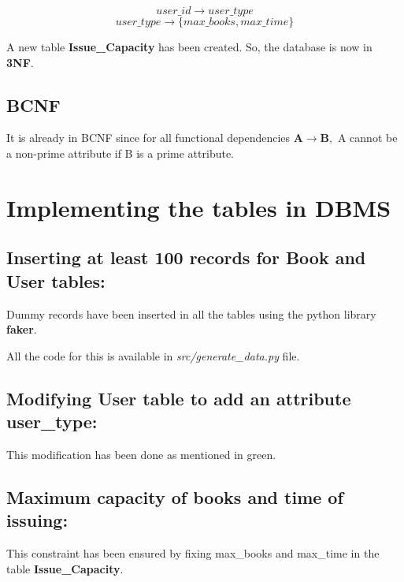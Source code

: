 \documentclass{article}
\begin{document}
\[user\_id \rightarrow user\_type\]
\[user\_type \rightarrow \{max\_books, max\_time\}\]

A new table \textbf{\color{green}Issue\_Capacity} has been created. 
So, the database is now in \textbf{3NF}.
\subsection{BCNF} It is already in BCNF since for all functional dependencies $\textbf{A} \rightarrow \textbf{B},$ A cannot be a non-prime attribute if B is a prime attribute. 

\section{Implementing the tables in DBMS}
\subsection{Inserting at least 100 records for Book and User tables:}
Dummy records have been inserted in all the tables using the python library \textbf{faker}.

All the code for this is available in \textit{src/generate\_data.py} file.

\subsection{Modifying User table to add an attribute user\_type: } This modification has been done as mentioned in {\color{green}green}. 

\subsection{Maximum capacity of books and time of issuing:} 
This constraint has been ensured by fixing {\color{green}max\_books} and {\color{green}max\_time} in the table \textbf{\color{green}Issue\_Capacity}.
\end{document}
